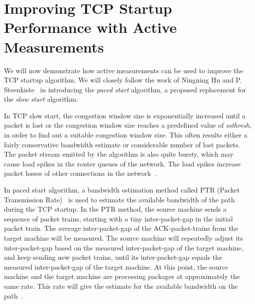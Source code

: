 
\section{Improving TCP Startup Performance with Active Measurements}

We will now demonstrate how active measurements can be used to improve the TCP startup algorithm. We will closely follow the work of Ningning Hu and P. Steenkiste~\cite{Hu03} in introducing the \textit{paced start} algorithm, a proposed replacement for the \textit{slow start} algorithm.

In TCP slow start, the congestion window size is exponentially increased until a packet is lost or the congestion window size reaches a predefined value of \textit{ssthresh}, in order to find out a suitable congestion window size. This often results either a fairly conservative bandwidth estimate or considerable number of lost packets. The packet stream emitted by the algorithm is also quite bursty, which may cause load spikes in the router queues of the network. The load spikes increase packet losses of other connections in the network~\cite{Hu03}.    

In paced start algorithm, a bandwidth estimation method called PTR (Packet Transmission Rate)~\cite{Hu03b} is used to estimate the available bandwidth of the path during the TCP startup. In the PTR method, the source machine sends a sequence of packet trains, starting with a tiny inter-packet-gap in the initial packet train. The average inter-packet-gap of the ACK-packet-trains from the target machine will be measured. The source machine will repeatedly adjust its inter-packet-gap based on the measured inter-packet-gap of the target machine, and keep sending new packet trains, until its inter-packet-gap equals the measured inter-packet-gap of the target machine. At this point, the source machine and the target machine are processing packages at approximately the same rate. This rate will give the estimate for the available bandwidth on the path~\cite{Hu03b}. 

